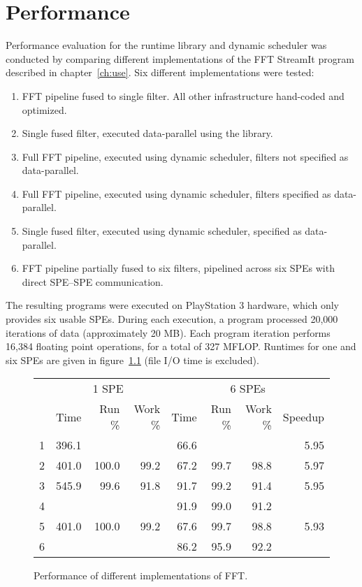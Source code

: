 \chapter{Performance}\label{ch:perf}

Performance evaluation for the runtime library and dynamic scheduler was conducted by comparing different implementations of the FFT StreamIt program described in chapter~\ref{ch:use}. Six different implementations were tested:
\begin{enumerate}
\item FFT pipeline fused to single filter. All other infrastructure hand-coded and optimized.
\item Single fused filter, executed data-parallel using the library.
\item Full FFT pipeline, executed using dynamic scheduler, filters not specified as data-parallel.
\item Full FFT pipeline, executed using dynamic scheduler, filters specified as data-parallel.
\item Single fused filter, executed using dynamic scheduler, specified as data-parallel.
\item FFT pipeline partially fused to six filters, pipelined across six SPEs with direct SPE--SPE communication.
\end{enumerate}

The resulting programs were executed on PlayStation 3 hardware, which only provides six usable SPEs. During each execution, a program processed 20,000 iterations of data (approximately 20 MB). Each program iteration performs 16,384 floating point operations, for a total of 327 MFLOP. Runtimes for one and six SPEs are given in figure~\ref{fig:perf:fft} (file I/O time is excluded).

\begin{figure}[!htb]
\begin{center}
\begin{tabular}{|r|r|r|r|r|r|r|r|}
\hline
& \multicolumn{3}{|c|}{1 SPE} & \multicolumn{4}{|c|}{6 SPEs} \\
\cline{2-8}
& Time & Run \% & Work \% & Time & Run \% & Work \% & Speedup \\
\hline
\textsf{1} & 396.1 & \multicolumn{2}{|c|}{} & 66.6 & \multicolumn{2}{|c|}{} & 5.95 \\
\hline
\textsf{2} & 401.0 & 100.0 & 99.2 & 67.2 & 99.7 & 98.8 & 5.97 \\
\hline
\textsf{3} & 545.9 & 99.6 & 91.8 & 91.7 & 99.2 & 91.4 & 5.95 \\
\hline
\textsf{4} & \multicolumn{3}{|c|}{} & 91.9 & 99.0 & 91.2 & \\
\hline
\textsf{5} & 401.0 & 100.0 & 99.2 & 67.6 & 99.7 & 98.8 & 5.93 \\
\hline
\textsf{6} & \multicolumn{3}{|c|}{} & 86.2 & 95.9 & 92.2 & \\
\hline
\end{tabular}
\end{center}
\caption{Performance of different implementations of FFT.}
\label{fig:perf:fft}
\end{figure}


